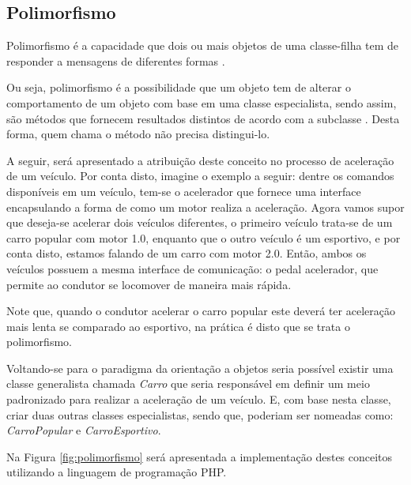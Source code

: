 \subsection{Polimorfismo}

Polimorfismo é a capacidade que dois ou mais objetos de uma classe-filha tem  de
responder a mensagens de diferentes formas
\cite{php5ConceitosProgramacaoEIntegracaoComBancoDeDados}.

Ou seja, polimorfismo é a possibilidade que um objeto tem de alterar o
comportamento de um objeto com base em uma classe especialista, sendo assim,
são métodos que fornecem resultados distintos  de acordo com a subclasse
\cite{php5ConceitosProgramacaoEIntegracaoComBancoDeDados}. Desta forma, quem
chama o método não precisa distingui-lo.

A seguir, será apresentado a atribuição deste conceito no processo de aceleração
de um veículo. Por conta disto, imagine o exemplo a seguir: dentre os comandos
disponíveis em um veículo, tem-se o acelerador que fornece uma interface
encapsulando a forma de como um motor realiza a aceleração. Agora vamos
supor que deseja-se acelerar dois veículos diferentes, o primeiro veículo
trata-se de um carro popular com motor 1.0, enquanto que o outro veículo é um
 esportivo, e por conta disto, estamos falando de um carro com motor 2.0. Então,
ambos os veículos possuem a mesma interface de comunicação: o pedal acelerador,
que permite ao condutor se locomover de maneira mais rápida.

Note que, quando o condutor acelerar o carro popular este deverá ter aceleração
mais lenta se comparado ao esportivo, na prática é disto que se trata o polimorfismo.

Voltando-se para o paradigma da orientação a objetos seria possível existir uma
classe generalista chamada \textit{Carro} que seria responsável em definir um
meio padronizado para realizar a aceleração de um veículo. E, com base nesta
classe, criar duas outras classes especialistas, sendo que, poderiam ser
nomeadas como: \textit{CarroPopular} e \textit{CarroEsportivo}.

Na Figura \ref{fig:polimorfismo} será apresentada a implementação destes conceitos
utilizando a linguagem de programação \acs{PHP}.

